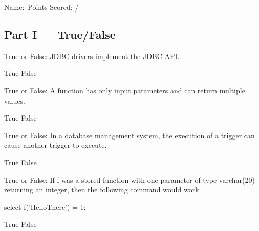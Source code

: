 \documentclass[12pt, addpoints, answers]{exam}
\begin{document}
\noindent Name:\ \makebox[3in]{\hrulefill}\hfill Points Scored: \underline{\hspace{3em}} / \numpoints
\begin{questions}

\section*{Part I — True/False}

\begin{minipage}{\linewidth}
\question[2]
True or False: JDBC drivers implement the JDBC API.\par\vspace{0.5em}
\begin{checkboxes}
    \CorrectChoice True
    \choice False
\end{checkboxes}
\end{minipage}\vspace{1em}

\begin{minipage}{\linewidth}
\question[2]
True or False: A function has only input parameters and can return multiple values.\par\vspace{0.5em}
\begin{checkboxes}
    \choice True
    \CorrectChoice False
\end{checkboxes}
\end{minipage}\vspace{1em}

\begin{minipage}{\linewidth}
\question[2]
True or False: In a database management system, the execution of a trigger can cause another trigger to execute.\par\vspace{0.5em}
\begin{checkboxes}
    \CorrectChoice True
    \choice False
\end{checkboxes}
\end{minipage}\vspace{1em}

\begin{minipage}{\linewidth}
\question[2]
True or False: If f was a stored function with one parameter of type varchar(20) returning an integer, then the following command would work.\par\vspace{0.5em}
select f('HelloThere') = 1;\par\vspace{0.5em}
\begin{checkboxes}
    \CorrectChoice True
    \choice False
\end{checkboxes}
\end{minipage}\vspace{1em}


\end{questions}
\end{document}

